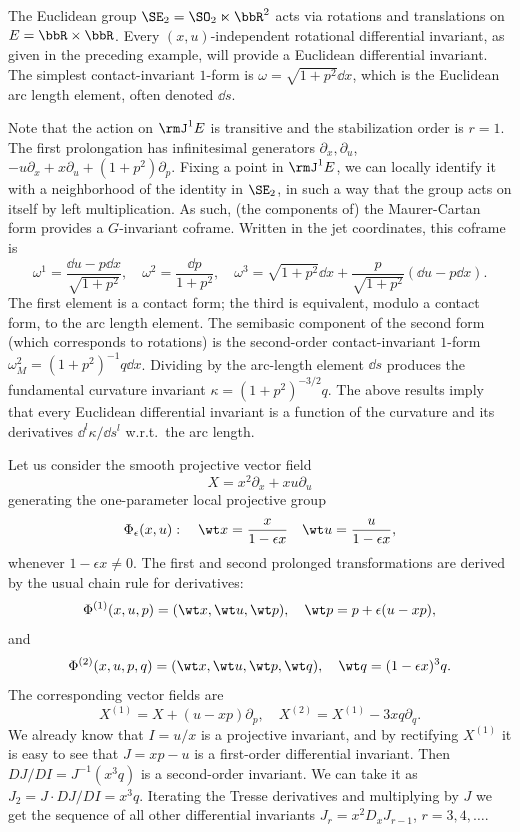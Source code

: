 \begin{example}
    The Euclidean group $\SE_2=\SO_2\ltimes\bbR^2$ acts via rotations and translations on $E=\bbR\times\bbR$. Every $(x,u)$-independent rotational differential invariant, as given in the preceding example, will provide a Euclidean differential invariant. The simplest contact-invariant $1$-form is $\omega=\sqrt{1+p^2}\dd x$, which is the Euclidean arc length element, often denoted $\dd s$.
    
    Note that the action on $\rmJ^1E$ is transitive and the stabilization order is $r=1$. The first prolongation has infinitesimal generators $\partial_x,\partial_u$, $-u\partial_x+x\partial_u+(1+p^2)\partial_p$. Fixing a point in $\rmJ^1E$, we can locally identify it with a neighborhood of the identity in $\SE_2$, in such a way that the group acts on itself by left multiplication. As such, (the components of) the Maurer-Cartan form provides a $G$-invariant coframe. Written in the jet coordinates, this coframe is 
    \[\omega^1=\frac{\dd u-p\dd x}{\sqrt{1+p^2}},\quad\omega^2=\frac{\dd p}{1+p^2},\quad \omega^3=\sqrt{1+p^2}\dd x+\frac{p}{\sqrt{1+p^2}}(\dd u-p\dd x).\]
    The first element is a contact form; the third is equivalent, modulo a contact form, to the arc length element. The semibasic component of the second form (which corresponds to rotations) is the second-order contact-invariant $1$-form $\omega^2_M=(1+p^2)^{-1}q\dd x$. Dividing by the arc-length element $\dd s$ produces the fundamental curvature invariant $\kappa=(1+p^2)^{-3/2}q$. The above results imply that every Euclidean differential invariant is a function of the curvature and its derivatives $\dd^l \kappa/\dd s^l$ w.r.t.\ the arc length.
\end{example}

\begin{example}
    Let us consider the smooth projective vector field 
    \[X=x^2\partial_x+xu\partial_u\]
    generating the one-parameter local projective group 
    \[\Phi_\epsilon(x,u):\quad \wt x=\frac{x}{1-\epsilon x}\quad \wt u=\frac{u}{1-\epsilon x},\]
    whenever $1-\epsilon x\neq 0$. The first and second prolonged transformations are derived by the usual chain rule for derivatives:
    \[\Phi^{(1)}(x,u,p)=(\wt x,\wt u,\wt p),\quad \wt p=p+\epsilon(u-xp),\]
    and 
    \[\Phi^{(2)}(x,u,p,q)=(\wt x,\wt u,\wt p,\wt q),\quad \wt q=(1-\epsilon x)^3 q.\]
    The corresponding vector fields are 
    \[X^{(1)}=X+(u-xp)\partial_p,\quad X^{(2)}=X^{(1)}-3xq\partial_q.\]
    We already know that $I=u/x$ is a projective invariant, and by rectifying $X^{(1)}$ it is easy to see that $J=xp-u$ is a first-order differential invariant. Then $DJ/DI=J^{-1}(x^3q)$ is a second-order invariant. We can take it as $J_2=J\cdot DJ/DI=x^3 q$. Iterating the Tresse derivatives and multiplying by $J$ we get the sequence of all other differential invariants $J_r=x^2 D_x J_{r-1}$, $r=3,4,\ldots$.
\end{example}


